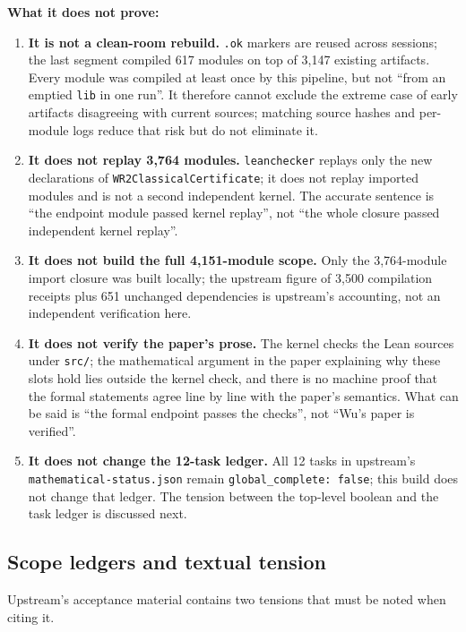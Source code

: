 \documentclass[11pt,a4paper]{article}
\theoremstyle{plain}
\theoremstyle{definition}
\begin{document}
\textbf{What it does not prove:}
\begin{enumerate}
\item \textbf{It is not a clean-room rebuild.} \texttt{.ok} markers are reused across sessions; the last segment compiled 617 modules on top of 3,147 existing artifacts. Every module was compiled at least once by this pipeline, but not ``from an emptied \texttt{lib} in one run''. It therefore cannot exclude the extreme case of early artifacts disagreeing with current sources; matching source hashes and per-module logs reduce that risk but do not eliminate it.
\item \textbf{It does not replay 3,764 modules.} \texttt{leanchecker} replays only the new declarations of \texttt{WR2ClassicalCertificate}; it does not replay imported modules and is not a second independent kernel. The accurate sentence is ``the endpoint module passed kernel replay'', not ``the whole closure passed independent kernel replay''.
\item \textbf{It does not build the full 4,151-module scope.} Only the 3,764-module import closure was built locally; the upstream figure of 3,500 compilation receipts plus 651 unchanged dependencies is upstream's accounting, not an independent verification here.
\item \textbf{It does not verify the paper's prose.} The kernel checks the Lean sources under \texttt{src/}; the mathematical argument in the paper explaining why these slots hold lies outside the kernel check, and there is no machine proof that the formal statements agree line by line with the paper's semantics. What can be said is ``the formal endpoint passes the checks'', not ``Wu's paper is verified''.
\item \textbf{It does not change the 12-task ledger.} All 12 tasks in upstream's \texttt{mathematical-status.json} remain \texttt{global\_complete: false}; this build does not change that ledger. The tension between the top-level boolean and the task ledger is discussed next.
\end{enumerate}

\subsection{Scope ledgers and textual tension}
\label{sec:wu-tension}

Upstream's acceptance material contains two tensions that must be noted when citing it.
\end{document}
